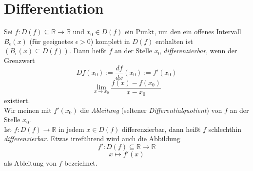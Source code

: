 
\section{Differentiation}
\begin{Definition}{
	Sei $f: D \left( f \right) \subseteq \mathbb{R} \rightarrow \mathbb{R}$ 
	und $x_0 \in D \left( f \right)$ ein Punkt, 
	um den ein offenes Intervall $B_{\epsilon} \left( x \right)$ 
	(für geeignetes $\epsilon > 0$) komplett 
	in $D \left( f \right)$ enthalten ist $\left( B_{\epsilon} \left( x \right)
	 \subseteq D \left( f \right) \right) $. Dann heißt $f$ an der Stelle $x_0$ 
	 \emph{differenzierbar}, wenn der Grenzwert
	\begin{equation*}
		Df\left(x_0\right) := \frac{df}{dx} 
		\left( x_0 \right) := f'\left( x_0 \right) 
	\end{equation*}
	\begin{equation*}
	\lim\limits_{x \rightarrow x_0}{\frac{f 
	\left( x \right) - f \left( x_0 \right) }{x - x_0} }
	\end{equation*} 
	existiert. \\
	Wir meinen mit $f'\left(x_0\right)$ die \emph{Ableitung} 
	(seltener \emph{Differentialquotient}) von $f$ an der Stelle $x_0$. \\
	Ist $f: D\left(f \right) \rightarrow \mathbb{R}$ in jedem $x \in D\left(f\right)
	$ differenzierbar, dann heißt $f$ schlechthin \emph{differenzierbar}. 
	Etwas irreführend wird auch die Abbildung  
	\begin{equation*}
		f': D\left(f\right) \subseteq \mathbb{R} \rightarrow \mathbb{R}
	\end{equation*}
	\begin{equation*}
		x \mapsto f'(x)
	\end{equation*}
	als Ableitung von $f$ bezeichnet.
}\end{Definition}


